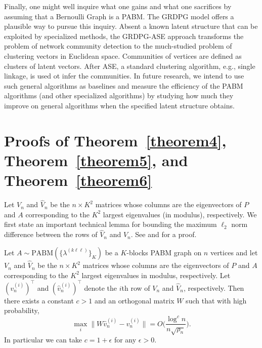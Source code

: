 \documentclass[12pt]{article}
\begin{document}
Finally, one might well inquire what one gains and what one sacrifices
by assuming that a Bernoulli Graph is a PABM.  The GRDPG model offers
a plausible way to pursue this inquiry.  Absent a known latent
structure that can be exploited by specialized methods, the GRDPG-ASE
approach transforms the problem of network community detection to the
much-studied problem of clustering vectors in Euclidean space.
Communities of vertices are defined as clusters of latent vectors.
After ASE, a standard clustering algorithm, e.g., single linkage, is
used ot infer the communities.  In future research, we intend to use
such general algorithms as baselines and measure the efficiency of the
PABM algorithms (and other specialized algorithms) by studying how
much they improve on general algorithms when the specified latent
structure obtains.

\appendix
\renewcommand\refname{References}
% 
% 
\printbibliography

\hypertarget{proofs}{%
\section{Proofs of Theorem~\ref{theorem4}, Theorem~\ref{theorem5}, and Theorem~\ref{theorem6}}}
Let \(V_n\) and \(\hat{V}_n\)
be the $n \times K^2$ matrices whose columns are the eigenvectors of \(P\) and \(A\) corresponding to the
$K^2$ largest eigenvalues (in modulus), respectively. 
We first state an important technical lemma for bounding the maximum
$\ell_2$ norm difference between the rows of $\hat{V}_n$ and
$V_n$. See \citet{cape_biometrika} and 
\citet[Lemma~5]{rubindelanchy2017statistical} for a proof. 
\begin{lemma}
  \label{lem:technical}
Let $A \sim \mathrm{PABM}(\{\lambda^{(k \ell \ell)}\}_{K})$ be a $K$-blocks
PABM graph on $n$ vertices and let \(V_n\) and \(\hat{V}_n\)
be the $n \times K^2$ matrices whose columns are the eigenvectors of \(P\) and \(A\) corresponding to the
$K^2$ largest eigenvalues in modulus, respectively.
Let \((v_n^{(i)})^\top\) and \((\hat{v}_n^{(i)})^\top\) denote the $i$th 
row of \(V_n\) and \(\hat{V}_n\), respectively. 
Then there exists a constant $c > 1$ and an orthogonal matrix $W$ such
that with high probability,
$$\max_{i} \|W \hat{v}_n^{(i)} - v_n^{(i)}\|  = O\Big(\frac{\log^{c}n}{n \sqrt{\rho_n}} \Big).$$
In particular we can take $c = 1 + \epsilon$ for any $\epsilon > 0$. 
\end{lemma}


%
\end{document}
